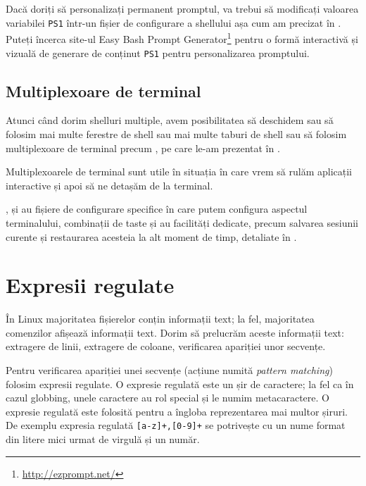 Dacă doriți să personalizați permanent promptul, va trebui să modificați valoarea
variabilei \texttt{PS1} într-un fișier de configurare a shellului așa cum am precizat în . Puteți încerca site-ul Easy Bash Prompt
Generator\footnote{\url{http://ezprompt.net/}} pentru o formă interactivă și vizuală de
generare de conținut \texttt{PS1} pentru personalizarea promptului.

\subsection{Multiplexoare de terminal}
\label{sec:cli:shell-start:mux}

Atunci când dorim shelluri multiple, avem posibilitatea să deschidem sau să
folosim mai multe ferestre de shell sau mai multe taburi de shell sau să
folosim multiplexoare de terminal precum ,  pe care le-am prezentat în
.

Multiplexoarele de terminal sunt utile în situația în care vrem să rulăm
aplicații interactive și apoi să ne detașăm de la terminal.

,  și  au fișiere de configurare specifice în care putem configura
aspectul terminalului, combinații de taste și au facilități dedicate, precum
salvarea sesiunii curente și restaurarea acesteia la alt moment de timp, detaliate în .

\section{Expresii regulate}
\label{sec:cli:regex}

În Linux majoritatea fișierelor conțin informații text; la fel, majoritatea
comenzilor afișează informații text. Dorim să prelucrăm aceste informații text:
extragere de linii, extragere de coloane, verificarea apariției unor secvențe.

Pentru verificarea apariției unei secvențe (acțiune numită \textit{pattern matching})
folosim expresii regulate. O expresie regulată este un șir de caractere; la fel ca în cazul globbing, unele
caractere au rol special și le numim metacaractere. O expresie regulată este
folosită pentru a îngloba reprezentarea mai multor șiruri. De exemplu expresia regulată \verb|[a-z]+,[0-9]+| se potrivește cu un nume format din litere mici urmat de virgulă și un număr.

